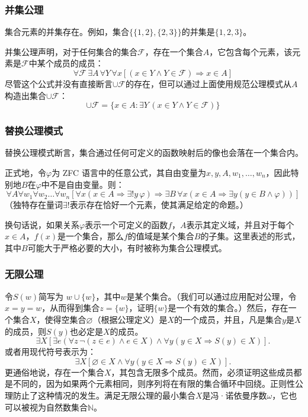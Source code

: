 \subsubsection{并集公理}  
集合元素的并集存在。例如，集合\(\{\{1, 2\}, \{2, 3\}\}\)的并集是\(\{1, 2, 3\}\)。

并集公理声明，对于任何集合的集合\(\mathcal{F}\)，存在一个集合\(A\)，它包含每个元素，该元素是\(\mathcal{F}\)中某个成员的成员：
\[
\forall \mathcal{F} \, \exists A \, \forall Y \, \forall x \left[ (x \in Y \land Y \in \mathcal{F}) \Rightarrow x \in A \right]~
\]
尽管这个公式并没有直接断言\(\cup \mathcal{F}\)的存在，但可以通过上面使用规范公理模式从\(A\)构造出集合\(\cup \mathcal{F}\)：
\[
\cup \mathcal{F} = \{ x \in A : \exists Y \, (x \in Y \land Y \in \mathcal{F}) \}~
\]
\subsubsection{替换公理模式} 
替换公理模式断言，集合通过任何可定义的函数映射后的像也会落在一个集合内。

正式地，令\( \varphi \)为 ZFC 语言中的任意公式，其自由变量为\( x, y, A, w_1, \dotsc, w_n \)，因此特别地\( B \)在\( \varphi \)中不是自由变量。则：
\[
\forall A \forall w_1 \forall w_2 \ldots \forall w_n \left[ \forall x \left( x \in A \Rightarrow \exists ! y \, \varphi \right) \Rightarrow \exists B \, \forall x \left( x \in A \Rightarrow \exists y \left( y \in B \land \varphi \right) \right) \right]~
\]
（独特存在量词\( \exists ! \)表示存在恰好一个元素，使其满足给定的命题。）

换句话说，如果关系\( \varphi \)表示一个可定义的函数\( f \)，\( A \)表示其定义域，并且对于每个\( x \in A \)，\( f(x) \)是一个集合，那么\( f \)的值域是某个集合\( B \)的子集。这里表述的形式，其中\( B \)可能大于严格必要的大小，有时被称为集合公理模式。
\subsubsection{无限公理}
令\( S(w) \)简写为 \( w \cup \{w\} \)，其中\( w \)是某个集合。（我们可以通过应用配对公理，令 \( x = y = w \)，从而得到集合\( z = \{w\} \)，证明\( \{w\} \)是一个有效的集合。）然后，存在一个集合\( X \)，使得空集合\( \varnothing \)（根据公理定义）是\( X \)的一个成员，并且，凡是集合\( y \)是\( X \) 的成员，则\( S(y) \)也必定是\( X \)的成员。
\[
\exists X \left[ \exists e \left( \forall z \, \neg (z \in e) \land e \in X \right) \land \forall y \left( y \in X \Rightarrow S(y) \in X \right) \right].~
\]
或者用现代符号表示为：
\[
\exists X \left[ \varnothing \in X \land \forall y \left( y \in X \Rightarrow S(y) \in X \right) \right].~
\]
更通俗地说，存在一个集合\( X \)，其包含无限多个成员。然而，必须证明这些成员都是不同的，因为如果两个元素相同，则序列将在有限的集合循环中回绕。正则性公理防止了这种情况的发生。满足无限公理的最小集合\( X \)是冯·诺依曼序数\( \omega \)，它也可以被视为自然数集合\( \mathbb{N} \)。
